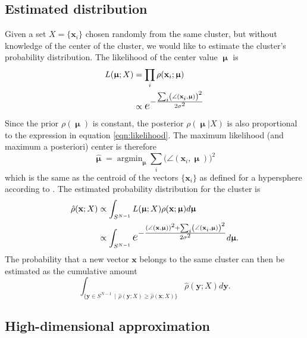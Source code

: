 \documentclass{article}
\DeclareMathOperator*{\argmin}{argmin}
\begin{document}
\subsection{Estimated distribution}
\label{sec:estimated}

Given a set $X=\{\mathbf{x}_i\}$ chosen randomly from the same cluster, but without knowledge of the center of the cluster, we would like to estimate the cluster's probability distribution. The likelihood of the center value $\bm{\upmu}$ is
\begin{equation}\label{eqn:likelihood}
\begin{split}
L(\bm{\upmu};X) & =\prod_i \rho(\mathbf{x}_i;\bm{\upmu}) \\
& \propto \mbox{\Large$e^{-\frac{\sum_i \left(\angle(\mathbf{x}_i,\bm{\upmu})\right)^2}{2\sigma^2}}$}
\end{split}
\end{equation}
Since the prior $\rho(\bm{\upmu})$ is constant, the posterior $\rho(\bm{\upmu}|X)$ is also proportional to the expression in equation \ref{eqn:likelihood}. The maximum likelihood (and maximum a posteriori) center is therefore
\begin{equation}
\bm{\hat{\upmu}}=\argmin_{\bm{\upmu}}\sum_i \big(\angle(\mathbf{x}_i,\bm{\upmu})\big)^2
\end{equation}
which is the same as the centroid of the vectors $\{\mathbf{x}_i\}$ as defined for a hypersphere according to \cite{buss2001spherical}. The estimated probability distribution for the cluster is
\begin{equation}
\begin{split}
\hat{\rho}(\mathbf{x};X) & \propto \int_{S^{N-1}}  L(\bm{\upmu};X)\rho(\mathbf{x};\bm{\upmu})d\bm{\upmu} \\
& \propto \int_{S^{N-1}}  \mbox{\Large$e^{-\frac{\left(\angle(\mathbf{x},\bm{\upmu})\right)^2+\sum_i \left(\angle(\mathbf{x}_i,\bm{\upmu})\right)^2}{2\sigma^2}}$} d\bm{\upmu}.
\end{split}
\end{equation}
The probability that a new vector $\mathbf{x}$ belongs to the same cluster can then be estimated as the cumulative amount
\begin{equation}\label{eqn:cumulative}
\int_{\{\mathbf{y}\in S^{N-1}\,\mid\,\hat{\rho}(\mathbf{y};X)\geq\hat{\rho}(\mathbf{x};X)\}} \hat{\rho}(\mathbf{y};X)d\mathbf{y}.
\end{equation}

\subsection{High-dimensional approximation}
\label{sec:approximation}
\end{document}
